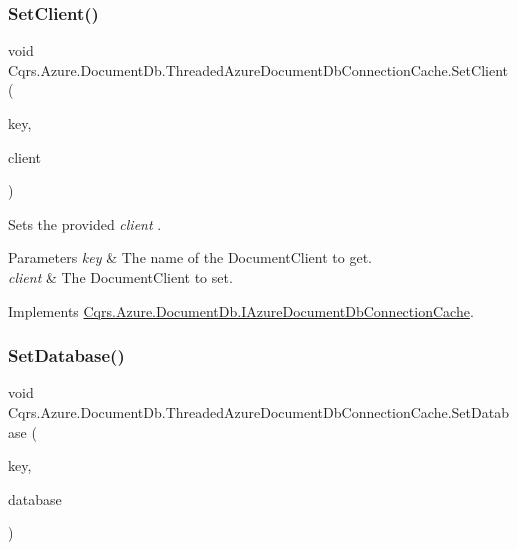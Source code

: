 \subsubsection{\texorpdfstring{Set\+Client()}{SetClient()}}
{\footnotesize\ttfamily void Cqrs.\+Azure.\+Document\+Db.\+Threaded\+Azure\+Document\+Db\+Connection\+Cache.\+Set\+Client (\begin{DoxyParamCaption}\item[{string}]{key,  }\item[{Document\+Client}]{client }\end{DoxyParamCaption})}



Sets the provided {\itshape client} . 


\begin{DoxyParams}{Parameters}
{\em key} & The name of the Document\+Client to get.\\
\hline
{\em client} & The Document\+Client to set.\\
\hline
\end{DoxyParams}


Implements \hyperlink{interfaceCqrs_1_1Azure_1_1DocumentDb_1_1IAzureDocumentDbConnectionCache_a38d813e12b632a93a2934e2b1252f409_a38d813e12b632a93a2934e2b1252f409}{Cqrs.\+Azure.\+Document\+Db.\+I\+Azure\+Document\+Db\+Connection\+Cache}.

\mbox{\label{classCqrs_1_1Azure_1_1DocumentDb_1_1ThreadedAzureDocumentDbConnectionCache_ab3c996b8e717aec1e4fc2a70fea52d53_ab3c996b8e717aec1e4fc2a70fea52d53}} 
\subsubsection{\texorpdfstring{Set\+Database()}{SetDatabase()}}
{\footnotesize\ttfamily void Cqrs.\+Azure.\+Document\+Db.\+Threaded\+Azure\+Document\+Db\+Connection\+Cache.\+Set\+Database (\begin{DoxyParamCaption}\item[{string}]{key,  }\item[{Database}]{database }\end{DoxyParamCaption})}



